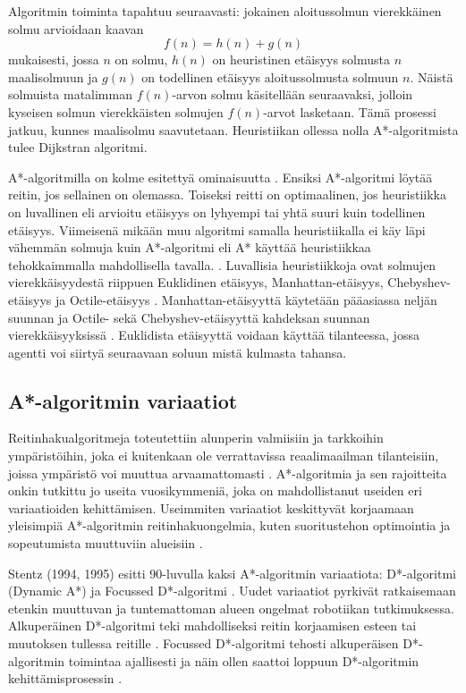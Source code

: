 \documentclass[utf8]{gradu3}
\begin{document}
Algoritmin toiminta tapahtuu seuraavasti: jokainen aloitussolmun vierekkäinen solmu arvioidaan kaavan \[f(n)=h(n)+g(n)\] mukaisesti, jossa \(n\) on solmu, \(h(n)\) on heuristinen etäisyys solmusta \(n\) maalisolmuun ja \(g(n)\) on todellinen etäisyys aloitussolmusta solmuun \(n\). Näistä solmuista matalimman \(f(n)\)-arvon solmu käsitellään seuraavaksi, jolloin kyseisen solmun vierekkäisten solmujen \(f(n)\)-arvot lasketaan. Tämä prosessi jatkuu, kunnes maalisolmu saavutetaan. Heuristiikan ollessa nolla A*-algoritmista tulee Dijkstran algoritmi.

A*-algoritmilla on kolme esitettyä ominaisuutta \parencite{hart1968formal}. Ensiksi A*-algoritmi löytää reitin, jos sellainen on olemassa. Toiseksi reitti on optimaalinen, jos heuristiikka on luvallinen eli arvioitu etäisyys on lyhyempi tai yhtä suuri kuin todellinen etäisyys. Viimeisenä mikään muu algoritmi samalla heuristiikalla ei käy läpi vähemmän solmuja kuin A*-algoritmi eli A* käyttää heuristiikkaa tehokkaimmalla mahdollisella tavalla. \parencite{hart1968formal,cui2011based}. Luvallisia heuristiikkoja ovat solmujen vierekkäisyydestä riippuen Euklidinen etäisyys, Manhattan-etäisyys, Chebyshev-etäisyys ja Octile-etäisyys \parencite{duchovn2014path,botea2013pathfinding}. Manhattan-etäisyyttä käytetään pääasiassa neljän suunnan ja Octile- sekä Chebyshev-etäisyyttä kahdeksan suunnan vierekkäisyyksissä \parencite{botea2013pathfinding}. Euklidista etäisyyttä voidaan käyttää tilanteessa, jossa agentti voi siirtyä seuraavaan soluun mistä kulmasta tahansa.

\subsection{A*-algoritmin variaatiot}
\label{avariaatiot}

Reitinhakualgoritmeja toteutettiin alunperin valmiisiin ja tarkkoihin ympäristöihin, joka ei kuitenkaan ole verrattavissa reaalimaailman tilanteisiin, joissa ympäristö voi muuttua arvaamattomasti \parencite{lawande2022systematic}. A*-algoritmia ja sen rajoitteita onkin tutkittu jo useita vuosikymmeniä, joka on mahdollistanut useiden eri variaatioiden kehittämisen. Useimmiten variaatiot keskittyvät korjaamaan yleisimpiä A*-algoritmin reitinhakuongelmia, kuten suoritustehon optimointia ja sopeutumista muuttuviin alueisiin \parencite{stentz1994optimal}.

Stentz (1994, 1995) esitti 90-luvulla kaksi A*-algoritmin variaatiota: D*-algoritmi (Dynamic A*) ja Focussed D*-algoritmi \parencite{stentz1994optimal,stentz1995focussed}. Uudet variaatiot pyrkivät ratkaisemaan etenkin muuttuvan ja tuntemattoman alueen ongelmat robotiikan tutkimuksessa. Alkuperäinen D*-algoritmi teki mahdolliseksi reitin korjaamisen esteen tai muutoksen tullessa reitille \parencite{stentz1994optimal}. Focussed D*-algoritmi tehosti alkuperäisen D*-algoritmin toimintaa ajallisesti ja näin ollen saattoi loppuun D*-algoritmin kehittämisprosessin \parencite{stentz1995focussed}.
\end{document}

